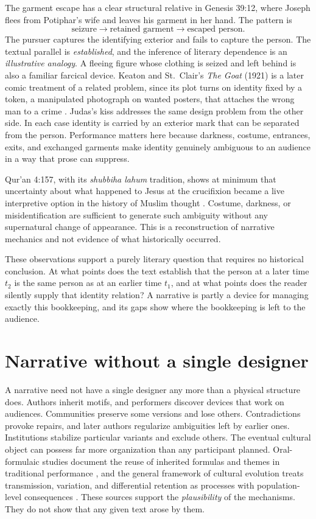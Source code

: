 \documentclass[11pt]{article}
\begin{document}
The garment escape has a clear structural relative in Genesis 39:12, where Joseph flees from Potiphar's wife and leaves his garment in her hand. The pattern is
\begin{equation*}
\text{seizure} \rightarrow \text{retained garment} \rightarrow \text{escaped person}.
\end{equation*}
The pursuer captures the identifying exterior and fails to capture the person. The textual parallel is \emph{established}, and the inference of literary dependence is an \emph{illustrative analogy}. A fleeing figure whose clothing is seized and left behind is also a familiar farcical device. Keaton and St.\ Clair's \emph{The Goat} (1921) is a later comic treatment of a related problem, since its plot turns on identity fixed by a token, a manipulated photograph on wanted posters, that attaches the wrong man to a crime \cite{goat}. Judas's kiss addresses the same design problem from the other side. In each case identity is carried by an exterior mark that can be separated from the person. Performance matters here because darkness, costume, entrances, exits, and exchanged garments make identity genuinely ambiguous to an audience in a way that prose can suppress.

Qur'an 4:157, with its \emph{shubbiha lahum} tradition, shows at minimum that uncertainty about what happened to Jesus at the crucifixion became a live interpretive option in the history of Muslim thought \cite{lawson}. Costume, darkness, or misidentification are sufficient to generate such ambiguity without any supernatural change of appearance. This is a reconstruction of narrative mechanics and not evidence of what historically occurred.

These observations support a purely literary question that requires no historical conclusion. At what points does the text establish that the person at a later time $t_2$ is the same person as at an earlier time $t_1$, and at what points does the reader silently supply that identity relation? A narrative is partly a device for managing exactly this bookkeeping, and its gaps show where the bookkeeping is left to the audience.

\section{Narrative without a single designer}

A narrative need not have a single designer any more than a physical structure does. Authors inherit motifs, and performers discover devices that work on audiences. Communities preserve some versions and lose others. Contradictions provoke repairs, and later authors regularize ambiguities left by earlier ones. Institutions stabilize particular variants and exclude others. The eventual cultural object can possess far more organization than any participant planned. Oral-formulaic studies document the reuse of inherited formulas and themes in traditional performance \cite{lord}, and the general framework of cultural evolution treats transmission, variation, and differential retention as processes with population-level consequences \cite{boyd,mesoudi}. These sources support the \emph{plausibility} of the mechanisms. They do not show that any given text arose by them.
\end{document}
